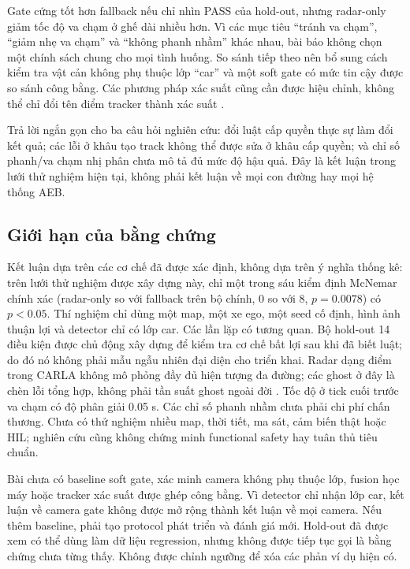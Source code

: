 \documentclass[conference]{IEEEtran}
\begin{document}
Gate cứng tốt hơn fallback nếu chỉ nhìn PASS của hold-out, nhưng radar-only
giảm tốc độ va chạm ở ghế dài nhiều hơn. Vì các mục tiêu ``tránh va chạm'',
``giảm nhẹ va chạm'' và ``không phanh nhầm'' khác nhau, bài báo không chọn
một chính sách chung cho mọi tình huống. So sánh tiếp theo nên bổ sung cách
kiểm tra vật cản không phụ thuộc lớp ``car'' và một soft gate có mức tin cậy
được so sánh công bằng. Các phương pháp xác suất cũng cần được hiệu chỉnh,
không thể chỉ đổi tên điểm tracker thành xác suất
\cite{sandblom2011threat,lindenmaier2022existence}.

Trả lời ngắn gọn cho ba câu hỏi nghiên cứu: đổi luật cấp quyền thực sự làm
đổi kết quả; các lỗi ở khâu tạo track không thể được sửa ở khâu cấp quyền;
và chỉ số phanh/va chạm nhị phân chưa mô tả đủ mức độ hậu quả. Đây là kết
luận trong lưới thử nghiệm hiện tại, không phải kết luận về mọi con đường
hay mọi hệ thống AEB.

\subsection{Giới hạn của bằng chứng}\label{sec:limits}
Kết luận dựa trên các cơ chế đã được xác định, không dựa trên ý nghĩa thống kê:
trên lưới thử nghiệm được xây dựng này, chỉ một trong sáu kiểm định McNemar
chính xác (radar-only so với fallback trên bộ chính, 0 so với 8, $p=0.0078$)
có $p<0.05$.
Thí nghiệm chỉ dùng một map, một xe ego, một seed cố định, hình ảnh thuận lợi
và detector chỉ có lớp car. Các lần lặp có tương quan. Bộ hold-out 14 điều
kiện được chủ động xây dựng để kiểm tra cơ chế bất lợi sau khi đã biết luật;
do đó nó không phải mẫu ngẫu nhiên đại diện cho triển khai. Radar dạng điểm
trong CARLA không mô phỏng đầy đủ hiện tượng đa đường; các ghost ở đây là
chèn lỗi tổng hợp, không phải tần suất ghost ngoài đời
\cite{kraus2021ghost,magosi2022radar}. Tốc độ ở tick cuối trước va chạm có
độ phân giải 0.05 s. Các chỉ số phanh nhầm chưa phải chi phí chấn thương.
Chưa có thử nghiệm nhiều map, thời tiết, ma sát, cảm biến thật hoặc HIL;
nghiên cứu cũng không chứng minh functional safety hay tuân thủ tiêu chuẩn.

Bài chưa có baseline soft gate, xác minh camera không phụ thuộc lớp, fusion
học máy hoặc tracker xác suất được ghép công bằng. Vì detector chỉ nhận lớp
car, kết luận về camera gate không được mở rộng thành kết luận về mọi camera.
Nếu thêm baseline, phải tạo protocol phát triển và đánh giá mới. Hold-out đã
được xem có thể dùng làm dữ liệu regression, nhưng không được tiếp tục gọi là
bằng chứng chưa từng thấy. Không được chỉnh ngưỡng để xóa các phản ví dụ hiện
có.
\end{document}
